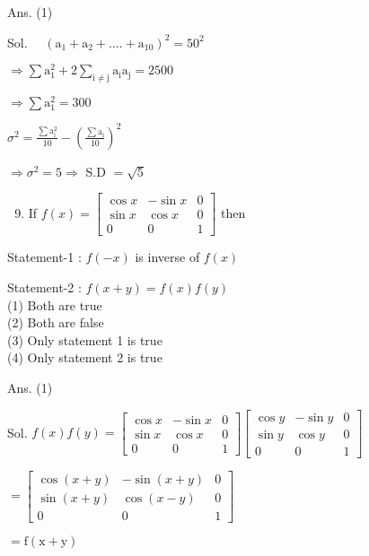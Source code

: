 \documentclass[10pt]{article}
\begin{document}
Ans. (1)

Sol. $\quad\left(\mathrm{a}_{1}+\mathrm{a}_{2}+\ldots .+\mathrm{a}_{10}\right)^{2}=50^{2}$

$\Rightarrow \sum \mathrm{a}_{1}^{2}+2 \sum_{\mathrm{i} \neq \mathrm{j}} \mathrm{a}_{\mathrm{i}} \mathrm{a}_{\mathrm{j}}=2500$

$\Rightarrow \sum \mathrm{a}_{1}^{2}=300$

$\sigma^{2}=\frac{\sum \mathrm{a}_{\mathrm{i}}^{2}}{10}-\left(\frac{\sum \mathrm{a}_{\mathrm{i}}}{10}\right)^{2}$

$\Rightarrow \sigma^{2}=5 \Rightarrow$ S.D $=\sqrt{5}$

\begin{enumerate}
  \setcounter{enumi}{8}
  \item If $f(x)=\left[\begin{array}{ccc}\cos x & -\sin x & 0 \\ \sin x & \cos x & 0 \\ 0 & 0 & 1\end{array}\right]$ then
\end{enumerate}

Statement-1 : $f(-x)$ is inverse of $f(x)$

Statement-2 : $f(x+y)=f(x) f(y)$\\
(1) Both are true\\
(2) Both are false\\
(3) Only statement 1 is true\\
(4) Only statement 2 is true

Ans. (1)

Sol. $f(x) f(y)=\left[\begin{array}{ccc}\cos x & -\sin x & 0 \\ \sin x & \cos x & 0 \\ 0 & 0 & 1\end{array}\right]\left[\begin{array}{ccc}\cos y & -\sin y & 0 \\ \sin y & \cos y & 0 \\ 0 & 0 & 1\end{array}\right]$

$=\left[\begin{array}{ccc}\cos (x+y) & -\sin (x+y) & 0 \\ \sin (x+y) & \cos (x-y) & 0 \\ 0 & 0 & 1\end{array}\right]$

$=\mathrm{f}(\mathrm{x}+\mathrm{y})$
\end{document}
